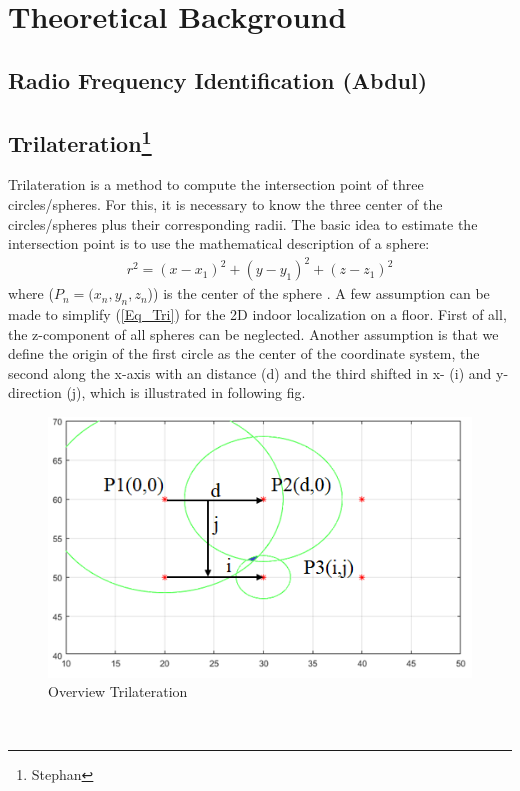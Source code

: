 \section{Theoretical Background} 

\subsection{Radio Frequency Identification (Abdul) }

\subsection[Trilateration]{Trilateration\footnote{Stephan}}
Trilateration is a method to compute the intersection point of three circles/spheres. For this, it is necessary to know the three center of the circles/spheres plus their corresponding radii. The basic idea to estimate the intersection point is to use the mathematical description of a sphere:
\begin{align}\label{Eq_Tri}
r^2 = (x-x_1)^2 + (y-y_1)^2 + (z-z_1)^2  
\end{align} 
where ($P_n=(x_n,y_n,z_n$)) is the center of the sphere \cite{Cotera.2016}. A few assumption can be made to simplify (\ref{Eq_Tri}) for the 2D indoor localization on a floor. First of all, the z-component of all spheres can be neglected. Another assumption is that we define the origin of the first circle as the center of the coordinate system, the second along the x-axis with an distance (d) and the third shifted in x- (i) and y-direction (j), which is illustrated in following fig.\\ 
\begin{figure}[!htbp]
 \centering
 \includegraphics[width = 13cm]{Pictures/Trilateration_1}
 \caption{Overview Trilateration}
 \label{Tri_1}
 \end{figure}\\ 

